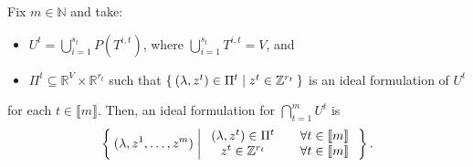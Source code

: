 \documentclass[opre,nonblindrev]{informs3} %
\newcommand{\bbN}{\mathbb{N}}
\newcommand{\bbR}{\mathbb{R}}
\newcommand{\bbZ}{\mathbb{Z}}
\begin{document}

\begin{theorem} \label{thm:combining-formulations}
    Fix $m \in \bbN$ and take:
    \begin{itemize}
        \item $U^t = \bigcup_{i=1}^{s_t} P(T^{i,t})$, where $\bigcup_{i=1}^{s_t} T^{i,t} = V$, and
        \item $\Pi^t\subseteq \mathbb{R}^{V} \times \bbR^{r_t}$ such that $\Set{(\lambda,z^t)\in \Pi^t | z^t \in \bbZ^{r_t}}$ is an ideal formulation of $U^t$
    \end{itemize}
    for each $t \in \llbracket m \rrbracket$. Then, an ideal formulation for $\bigcap_{t=1}^m U^t$ is
    \begin{equation}\label{prop:combining-formulations:form}
        \Set{
            (\lambda,z^1,\ldots,z^m) | \begin{array}{cl}
                (\lambda,z^t) \in \Pi^t \quad &\forall t \in \llbracket m \rrbracket \\
                z^t \in \bbZ^{r_t} \quad &\forall t \in \llbracket m \rrbracket
            \end{array}
        }.
        \end{equation}
\end{theorem}
\end{document}
